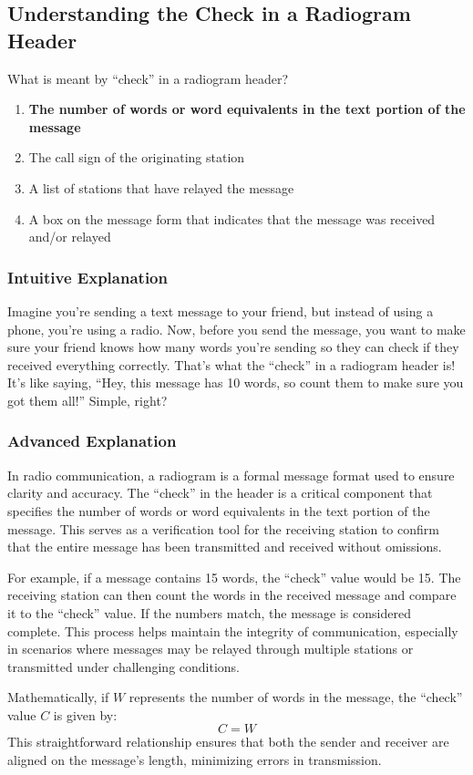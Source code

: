 \subsection{Understanding the Check in a Radiogram Header}
\label{T2C11}

\begin{tcolorbox}[colback=gray!10!white,colframe=black!75!black,title=T2C11]
What is meant by “check” in a radiogram header?  
\begin{enumerate}[label=\Alph*.]  
    \item \textbf{The number of words or word equivalents in the text portion of the message}  
    \item The call sign of the originating station  
    \item A list of stations that have relayed the message  
    \item A box on the message form that indicates that the message was received and/or relayed  
\end{enumerate}  
\end{tcolorbox}

\subsubsection{Intuitive Explanation}  
Imagine you’re sending a text message to your friend, but instead of using a phone, you’re using a radio. Now, before you send the message, you want to make sure your friend knows how many words you’re sending so they can check if they received everything correctly. That’s what the “check” in a radiogram header is! It’s like saying, “Hey, this message has 10 words, so count them to make sure you got them all!” Simple, right?

\subsubsection{Advanced Explanation}  
In radio communication, a radiogram is a formal message format used to ensure clarity and accuracy. The “check” in the header is a critical component that specifies the number of words or word equivalents in the text portion of the message. This serves as a verification tool for the receiving station to confirm that the entire message has been transmitted and received without omissions.  

For example, if a message contains 15 words, the “check” value would be 15. The receiving station can then count the words in the received message and compare it to the “check” value. If the numbers match, the message is considered complete. This process helps maintain the integrity of communication, especially in scenarios where messages may be relayed through multiple stations or transmitted under challenging conditions.  

Mathematically, if \( W \) represents the number of words in the message, the “check” value \( C \) is given by:  
\[ C = W \]  
This straightforward relationship ensures that both the sender and receiver are aligned on the message’s length, minimizing errors in transmission.  

